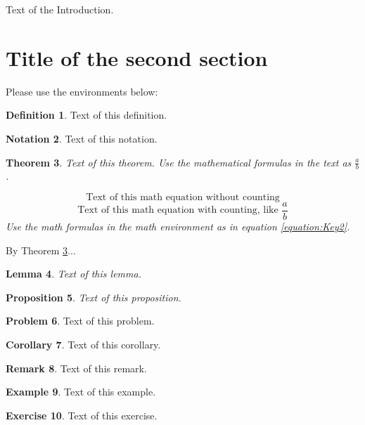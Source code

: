 \documentclass[a4paper,12pt]{article}
\newtheorem{theorem}{Theorem}[section]
\newtheorem{lemma}[theorem]{Lemma}
\newtheorem{proposition}[theorem]{Proposition}%
\theoremstyle{definition}
\newtheorem{definition}[theorem]{Definition}
\newtheorem{notation}[theorem]{Notation}
\newtheorem{problem}[theorem]{Problem}%
\newtheorem{corollary}[theorem]{Corollary}%
\newtheorem{remark}[theorem]{Remark}%
\newtheorem{example}[theorem]{Example}%
\newtheorem{exercise}[theorem]{Exercise}%
\begin{document}
Text of the Introduction.

\section{Title of the second section}

Please use the environments below:

\begin{definition}
Text of this definition.
\end{definition}

\begin{notation}
Text of this notation.
\end{notation}

\begin{theorem}\label{theorem:Key1}
Text of this theorem. Use the mathematical formulas in the text as $\frac{a}{b}$. 
\par 
\[
\text{Text of this math equation without counting}
\]
\begin{equation}\label{equation:Key2}
\text{Text of this math equation with counting, like } \dfrac{a}{b}
\end{equation}
Use the math formulas in the math environment as in equation \ref{equation:Key2}. 
\end{theorem}

\par By Theorem \ref{theorem:Key1}...

\begin{lemma}
Text of this lemma.
\end{lemma}

\begin{proposition}
Text of this proposition.
\end{proposition}

\begin{problem}
Text of this problem.
\end{problem}

\begin{corollary}
Text of this corollary.
\end{corollary}

\begin{remark}
Text of this remark.
\end{remark}

\begin{example}
Text of this example.
\end{example}

\begin{exercise}
Text of this exercise.
\end{exercise}
\end{document}
